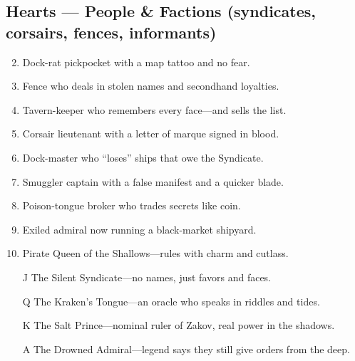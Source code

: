 \subsection*{Hearts --- People \& Factions (syndicates, corsairs, fences, informants)}
\begin{enumerate}
\setcounter{enumi}{1}
\item Dock-rat pickpocket with a map tattoo and no fear.
\item Fence who deals in stolen names and secondhand loyalties.
\item Tavern-keeper who remembers every face---and sells the list.
\item Corsair lieutenant with a letter of marque signed in blood.
\item Dock-master who ``loses'' ships that owe the Syndicate.
\item Smuggler captain with a false manifest and a quicker blade.
\item Poison-tongue broker who trades secrets like coin.
\item Exiled admiral now running a black-market shipyard.
\item Pirate Queen of the Shallows---rules with charm and cutlass.
\item[J] The Silent Syndicate---no names, just favors and faces.
\item[Q] The Kraken's Tongue---an oracle who speaks in riddles and tides.
\item[K] The Salt Prince---nominal ruler of Zakov, real power in the shadows.
\item[A] The Drowned Admiral---legend says they still give orders from the deep.
\end{enumerate}

